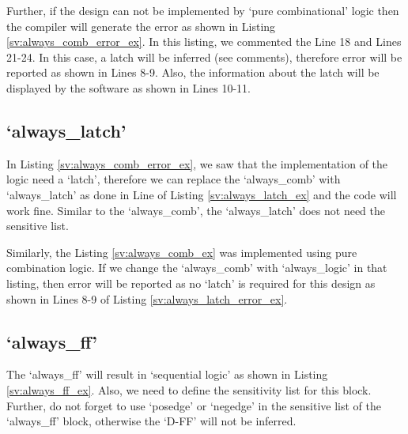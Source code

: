 
	
Further, if the design can not be implemented by `pure combinational' logic then the compiler will generate the error as shown in Listing \ref{sv:always_comb_error_ex}. In this listing, we commented the Line 18 and Lines 21-24. In this case, a latch will be inferred (see comments), therefore error will be reported as shown in Lines 8-9. Also, the information about the latch will be displayed by the software as shown in Lines 10-11.  
	



\subsection{`always\_latch'}
In Listing \ref{sv:always_comb_error_ex}, we saw that the implementation of the logic need a `latch', therefore we can replace the `always\_comb' with `always\_latch' as done in Line of Listing \ref{sv:always_latch_ex} and the code will work fine. Similar to the `always\_comb', the `always\_latch' does not need the sensitive list. 




Similarly, the Listing \ref{sv:always_comb_ex} was implemented using pure combination logic. If we change the `always\_comb' with `always\_logic' in that listing, then error will be reported as no `latch' is required for this design as shown in Lines 8-9 of Listing \ref{sv:always_latch_error_ex}. 



\subsection{`always\_ff'}
The `always\_ff' will result in `sequential logic' as shown in Listing \ref{sv:always_ff_ex}. Also, we need to define the sensitivity list for this block. Further, do not forget to use `posedge' or `negedge' in the sensitive list of the `always\_ff' block, otherwise the `D-FF' will not be inferred. 

